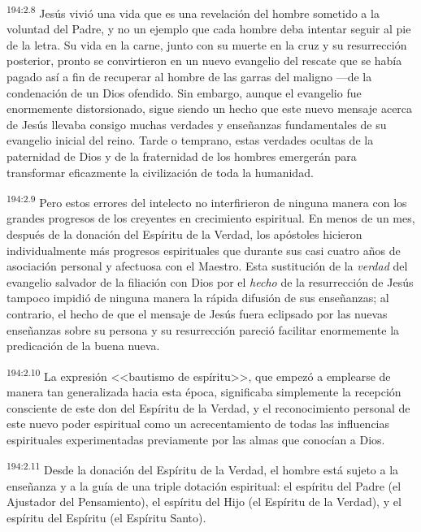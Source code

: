 \par 
\textsuperscript{194:2.8} Jesús vivió una vida que es una revelación del hombre sometido a la voluntad del Padre, y no un ejemplo que cada hombre deba intentar seguir al pie de la letra. Su vida en la carne, junto con su muerte en la cruz y su resurrección posterior, pronto se convirtieron en un nuevo evangelio del rescate que se había pagado así a fin de recuperar al hombre de las garras del maligno ---de la condenación de un Dios ofendido. Sin embargo, aunque el evangelio fue enormemente distorsionado, sigue siendo un hecho que este nuevo mensaje acerca de Jesús llevaba consigo muchas verdades y enseñanzas fundamentales de su evangelio inicial del reino. Tarde o temprano, estas verdades ocultas de la paternidad de Dios y de la fraternidad de los hombres emergerán para transformar eficazmente la civilización de toda la humanidad.

\par 
\textsuperscript{194:2.9} Pero estos errores del intelecto no interfirieron de ninguna manera con los grandes progresos de los creyentes en crecimiento espiritual. En menos de un mes, después de la donación del Espíritu de la Verdad, los apóstoles hicieron individualmente más progresos espirituales que durante sus casi cuatro años de asociación personal y afectuosa con el Maestro. Esta sustitución de la \textit{verdad} del evangelio salvador de la filiación con Dios por el \textit{hecho} de la resurrección de Jesús tampoco impidió de ninguna manera la rápida difusión de sus enseñanzas; al contrario, el hecho de que el mensaje de Jesús fuera eclipsado por las nuevas enseñanzas sobre su persona y su resurrección pareció facilitar enormemente la predicación de la buena nueva.

\par 
\textsuperscript{194:2.10} La expresión <<bautismo de espíritu>>, que empezó a emplearse de manera tan generalizada hacia esta época, significaba simplemente la recepción consciente de este don del Espíritu de la Verdad, y el reconocimiento personal de este nuevo poder espiritual como un acrecentamiento de todas las influencias espirituales experimentadas previamente por las almas que conocían a Dios.

\par 
\textsuperscript{194:2.11} Desde la donación del Espíritu de la Verdad, el hombre está sujeto a la enseñanza y a la guía de una triple dotación espiritual: el espíritu del Padre (el Ajustador del Pensamiento), el espíritu del Hijo (el Espíritu de la Verdad), y el espíritu del Espíritu (el Espíritu Santo).

